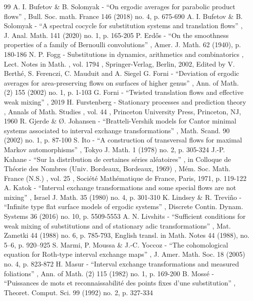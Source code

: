 \documentclass[11pt]{article}
\numberwithin{equation}{section}\newcommand{\Relation}[2][]{}\newtheorem*{prop*}{Proposition}
\theoremstyle{plain}
\theoremstyle{definition}
\begin{document}
\begin{thebibliography}{99}
 A. I. Bufetov \& B. Solomyak - “On ergodic averages for parabolic product flows” , Bull. Soc. math. France 146 (2018) no. 4, p. 675-690
 A. I. Bufetov \& B. Solomyak - “A spectral cocycle for substitution systems and translation flows” , J. Anal. Math. 141 (2020) no. 1, p. 165-205
 P. Erdős - “On the smoothness properties of a family of Bernoulli convolutions” , Amer. J. Math. 62 (1940), p. 180-186
 N. P. Fogg - Substitutions in dynamics, arithmetics and combinatorics , Lect. Notes in Math. , vol. 1794 , Springer-Verlag, Berlin, 2002, Edited by V. Berthé, S. Ferenczi, C. Mauduit and A. Siegel
 G. Forni - “Deviation of ergodic averages for area-preserving flows on surfaces of higher genus” , Ann. of Math. (2) 155 (2002) no. 1, p. 1-103
 G. Forni - “Twisted translation flows and effective weak mixing” , 2019
 H. Furstenberg - Stationary processes and prediction theory , Annals of Math. Studies , vol. 44 , Princeton University Press, Princeton, NJ, 1960
 R. Gjerde \& Ø. Johansen - “Bratteli-Vershik models for Cantor minimal systems associated to interval exchange transformations” , Math. Scand. 90 (2002) no. 1, p. 87-100
 S. Ito - “A construction of transversal flows for maximal Markov automorphisms” , Tokyo J. Math. 1 (1978) no. 2, p. 305-324
 J.-P. Kahane - “Sur la distribution de certaines séries aléatoires” , in Colloque de Théorie des Nombres (Univ. Bordeaux, Bordeaux, 1969) , Mém. Soc. Math. France (N.S.) , vol. 25 , Société Mathématique de France, Paris, 1971, p. 119-122
 A. Katok - “Interval exchange transformations and some special flows are not mixing” , Israel J. Math. 35 (1980) no. 4, p. 301-310
 K. Lindsey \& R. Treviño - “Infinite type flat surface models of ergodic systems” , Discrete Contin. Dynam. Systems 36 (2016) no. 10, p. 5509-5553
 A. N. Livshits - “Sufficient conditions for weak mixing of substitutions and of stationary adic transformations” , Mat. Zametki 44 (1988) no. 6, p. 785-793, English transl. in Math. Notes 44 (1988), no. 5–6, p. 920–925
 S. Marmi, P. Moussa \& J.-C. Yoccoz - “The cohomological equation for Roth-type interval exchange maps” , J. Amer. Math. Soc. 18 (2005) no. 4, p. 823-872
 H. Masur - “Interval exchange transformations and measured foliations” , Ann. of Math. (2) 115 (1982) no. 1, p. 169-200
 B. Mossé - “Puissances de mots et reconnaissabilité des points fixes d’une substitution” , Theoret. Comput. Sci. 99 (1992) no. 2, p. 327-334

\end{thebibliography}
\end{document}
